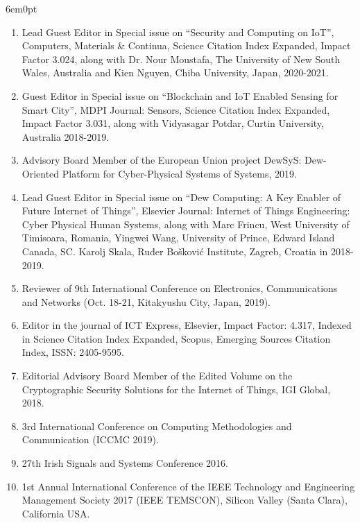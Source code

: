 \documentclass[11pt,a4paper]{moderncv}
\begin{document}
\begin{adjustwidth}{6em}{0pt}
\begin{enumerate}
		\item Lead Guest Editor in Special issue on “Security and Computing on IoT”, Computers, Materials \& Continua, Science Citation Index Expanded, Impact Factor 3.024, along with Dr. Nour Moustafa, The University of New South Wales, Australia and Kien Nguyen, Chiba University, Japan, 2020-2021.
		
		\item Guest Editor in Special issue on “Blockchain and IoT Enabled Sensing for Smart City”, MDPI Journal: Sensors, Science Citation Index Expanded, Impact Factor 3.031, along with Vidyasagar Potdar, Curtin University, Australia 2018-2019.
		
		\item Advisory Board Member of the European Union project DewSyS: Dew-Oriented Platform for Cyber-Physical Systems of Systems, 2019.
		
		\item Lead Guest Editor in Special issue on “Dew Computing: A Key Enabler of Future Internet of Things”, Elsevier Journal: Internet of Things Engineering: Cyber Physical Human Systems, along with Marc Frincu, West University of Timisoara, Romania, Yingwei Wang, University of Prince, Edward Island Canada, SC. Karolj Skala, Ruđer Bošković Institute, Zagreb, Croatia in 2018-2019.
		
		\item Reviewer of 9th International Conference on Electronics, Communications and Networks (Oct. 18-21, Kitakyushu City, Japan, 2019).
		
		\item Editor in the journal of ICT Express, Elsevier, Impact Factor: 4.317, Indexed in Science Citation Index Expanded, Scopus, Emerging Sources Citation Index, ISSN: 2405-9595.
		
		\item Editorial Advisory Board Member of the Edited Volume on the Cryptographic Security Solutions for the Internet of Things, IGI Global, 2018.
		
		\item 3rd International Conference on Computing Methodologies and Communication (ICCMC 2019).
		
		\item 27th Irish Signals and Systems Conference 2016.
		
		\item 1st Annual International Conference of the IEEE Technology and Engineering Management Society 2017 (IEEE TEMSCON), Silicon Valley (Santa Clara), California USA.
		

\end{enumerate}
\end{adjustwidth}
\end{document}
